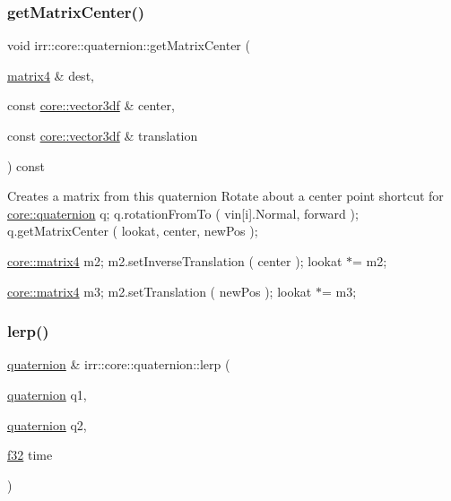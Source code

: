 \subsubsection{\texorpdfstring{get\+Matrix\+Center()}{getMatrixCenter()}\hspace{0.1cm}{\footnotesize\ttfamily [2/2]}}
{\footnotesize\ttfamily void irr\+::core\+::quaternion\+::get\+Matrix\+Center (\begin{DoxyParamCaption}\item[{\hyperlink{namespaceirr_1_1core_a4c9d4e29899535971052810954a14431}{matrix4} \&}]{dest,  }\item[{const \hyperlink{namespaceirr_1_1core_ae6e2b2a6c552833ebbd5b7463d03586b}{core\+::vector3df} \&}]{center,  }\item[{const \hyperlink{namespaceirr_1_1core_ae6e2b2a6c552833ebbd5b7463d03586b}{core\+::vector3df} \&}]{translation }\end{DoxyParamCaption}) const}

Creates a matrix from this quaternion Rotate about a center point shortcut for \hyperlink{classirr_1_1core_1_1quaternion}{core\+::quaternion} q; q.\+rotation\+From\+To ( vin\mbox{[}i\mbox{]}.Normal, forward ); q.\+get\+Matrix\+Center ( lookat, center, new\+Pos );

\hyperlink{namespaceirr_1_1core_a4c9d4e29899535971052810954a14431}{core\+::matrix4} m2; m2.\+set\+Inverse\+Translation ( center ); lookat $\ast$= m2;

\hyperlink{namespaceirr_1_1core_a4c9d4e29899535971052810954a14431}{core\+::matrix4} m3; m2.\+set\+Translation ( new\+Pos ); lookat $\ast$= m3; \mbox{\label{classirr_1_1core_1_1quaternion_a75b5cb2d26397f07399e79ea20f1aff1}} 
\subsubsection{\texorpdfstring{lerp()}{lerp()}\hspace{0.1cm}{\footnotesize\ttfamily [1/2]}}
{\footnotesize\ttfamily \hyperlink{classirr_1_1core_1_1quaternion}{quaternion} \& irr\+::core\+::quaternion\+::lerp (\begin{DoxyParamCaption}\item[{\hyperlink{classirr_1_1core_1_1quaternion}{quaternion}}]{q1,  }\item[{\hyperlink{classirr_1_1core_1_1quaternion}{quaternion}}]{q2,  }\item[{\hyperlink{namespaceirr_a0277be98d67dc26ff93b1a6a1d086b07}{f32}}]{time }\end{DoxyParamCaption})\hspace{0.3cm}{\ttfamily [inline]}}



